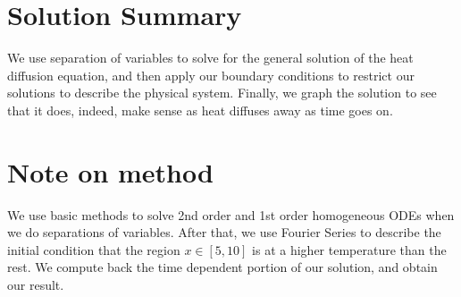 \documentclass{article}
\numberwithin{equation}{section}
\begin{document}
\section{Solution Summary}

We use separation of variables to solve for the general solution of the heat diffusion equation, and then apply our boundary conditions to restrict our solutions to describe the physical system. Finally, we graph the solution to see that it does, indeed, make sense as heat diffuses away as time goes on.

\section{Note on method}

We use basic methods to solve 2nd order and 1st order homogeneous ODEs when we do separations of variables. After that, we use Fourier Series to describe the initial condition that the region $x \in [5, 10]$ is at a higher temperature than the rest. We compute back the time dependent portion of our solution, and obtain our result.
\end{document}
